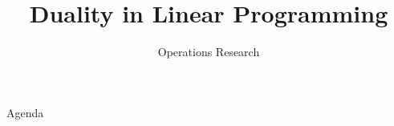 \documentclass[../slides.tex]{subfiles}
\title{Duality in Linear Programming}
\subtitle{Operations Research} %
\begin{document}
\begin{frame}
  \maketitle
\end{frame}


\begin{frame}{Agenda}
  \tableofcontents
\end{frame}






\begin{frame}
  \maketitle
\end{frame}
\end{document}
